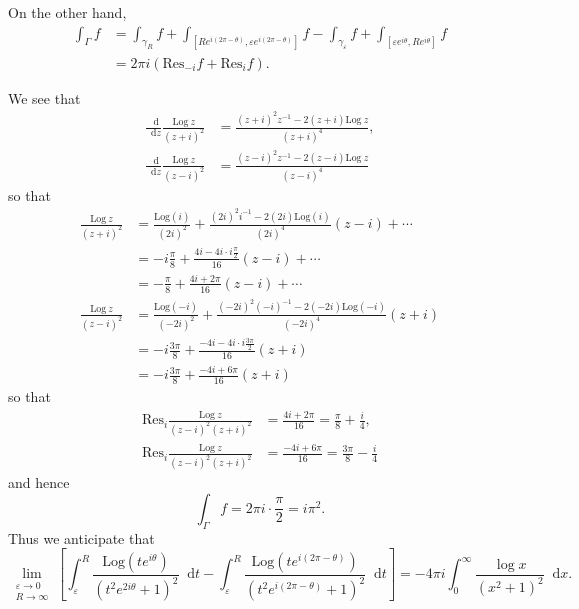 \documentclass{article}
\newcommand\Res{\mathrm{Res}}
\newcommand\Log{\mathrm{Log}}
\newcommand\dif{\mathop{}\!\mathrm{d}}
\begin{document}
On the other hand,
\begin{align*}
   \int_\Gamma
     f
&= \int_{\gamma_R}
     f
 + \int_{[R e^{i(2 \pi - \theta)},
          \varepsilon e^{i(2 \pi - \theta)}]}
     f
 - \int_{\gamma_\varepsilon}
     f
 + \int_{[\varepsilon e^{i \theta},
          R e^{i \theta}]}
     f \\
&= 2 \pi i
   \left(
     \Res_{-i} f
   + \Res_i f
   \right).
\end{align*}

We see that
\begin{align*}
   \frac{\dif}{\dif z}
   \frac{\Log~z}{(z + i)^2}
&= \frac{(z + i)^2 z^{-1} - 2(z + i)\Log~z}
        {(z + i)^4}, \\
   \frac{\dif}{\dif z}
   \frac{\Log~z}{(z - i)^2}
&= \frac{(z - i)^2 z^{-1} - 2(z - i)\Log~z}
        {(z - i)^4}
\end{align*}
so that
\begin{align*}
   \frac{\Log~z}{(z + i)^2}
&= \frac{\Log(i)}{(2i)^2}
 + \frac{(2i)^2 i^{-1} - 2(2i)\Log(i)}
        {(2i)^4}
   (z - i)
 + \cdots \\
&= -i\frac{\pi}{8}
 + \frac{4i - 4i \cdot i \frac{\pi}{2}}
        {16}
   (z - i)
 + \cdots \\
&= -\frac{\pi}{8}
 + \frac{4i + 2 \pi}{16} (z - i)
 + \cdots \\
   \frac{\Log~z}{(z - i)^2}
&= \frac{\Log(-i)}{(-2i)^2}
 + \frac{(-2i)^2 (-i)^{-1} - 2(-2i) \Log(-i)}
        {(-2i)^4}
   (z + i) \\
&= -i\frac{3 \pi}{8}
 + \frac{-4i - 4i \cdot i \frac{3 \pi}{2}}
        {16}
   (z + i) \\
&= -i\frac{3 \pi}{8}
 + \frac{-4i + 6 \pi}{16} (z + i)
\end{align*}
so that
\begin{align*}
   \Res_i \frac{\Log~z}{(z - i)^2 (z + i)^2}
&= \frac{4i + 2 \pi}{16}
 = \frac{\pi}{8} + \frac{i}{4}, \\
   \Res_i \frac{\Log~z}{(z - i)^2 (z + i)^2}
&= \frac{-4i + 6 \pi}{16}
 = \frac{3 \pi}{8} - \frac{i}{4}
\end{align*}
and hence
$$
  \int_\Gamma f
= 2 \pi i \cdot \frac{\pi}{2}
= i \pi^2.
$$
Thus we anticipate that
$$
  \lim_{\substack{\varepsilon \to 0 \\ R \to \infty}}
  \left[
    \int_\varepsilon^R
      \frac{\Log (t e^{i \theta})}
           {(t^2 e^{2 i \theta} + 1)^2}
      \dif t
  - \int_\varepsilon^R
      \frac{\Log (t e^{i (2\pi - \theta)})}
           {(t^2 e^{i (2 \pi - \theta)} + 1)^2}
      \dif t
  \right]
= -4 \pi i
  \int_0^\infty
    \frac{\log x}
         {(x^2 + 1)^2}
    \dif x.
$$
\end{document}
